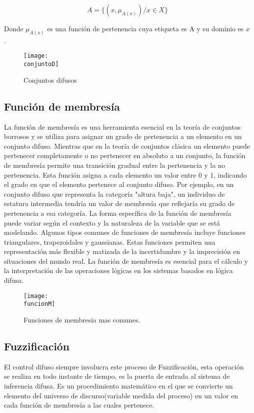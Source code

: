 \documentclass[a4paper, 12pt]{article}
\newcommand{\conjuntoD}{img/conjutodifuso.png}
\newcommand{\funcionM}{img/funcionM.png}
\begin{document}
    \begin{equation}
        A = \{ ( x,\mu_{A(x)} )/x \in X \}
    \end{equation}

    Donde $\mu_{A(x)}$ es una función de pertenencia cuya etiqueta es A y su dominio es $x$
    .
    \begin{figure}[H]
        \centering
        \texttt{[image: \\conjuntoD]}
        \caption{Conjuntos difusos}
        \label{fig:conjuntoD}
    \end{figure}

    \subsection{Función de membresía}
    La función de membresía es una herramienta esencial en la teoría de conjuntos borrosos y se utiliza para asignar un grado de pertenencia a un elemento en un conjunto difuso. Mientras que en la teoría de conjuntos clásica un elemento puede pertenecer completamente o no pertenecer en absoluto a un conjunto, la función de membresía permite una transición gradual entre la pertenencia y la no pertenencia.
    Esta función asigna a cada elemento un valor entre 0 y 1, indicando el grado en que el elemento pertenece al conjunto difuso. Por ejemplo, en un conjunto difuso que representa la categoría "altura baja", un individuo de estatura intermedia tendría un valor de membresía que reflejaría su grado de pertenencia a esa categoría.
    La forma específica de la función de membresía puede variar según el contexto y la naturaleza de la variable que se está modelando. Algunos tipos comunes de funciones de membresía incluye funciones triangulares, trapezoidales y gaussianas. Estas funciones permiten una representación más flexible y matizada de la incertidumbre y la imprecisión en situaciones del mundo real. La función de membresía es esencial para el cálculo y la interpretación de las operaciones lógicas en los sistemas basados en lógica difusa.

    \begin{figure}[H]
        \centering
        \texttt{[image: \\funcionM]}
        \caption{Funciones de membresia mas comunes.}
        \label{fig:funcionM}
    \end{figure}

    \subsection{Fuzzificación}
    El control difuso siempre involucra este proceso de Fuzzificación, esta operación se realiza en todo instante de tiempo, es la puerta de entrada al sistema de inferencia difusa. Es un procedimiento matemático en el que se convierte un elemento del universo de discurso(variable medida del proceso) en un valor en cada función de membresía a las cuales pertenece.
\end{document}
